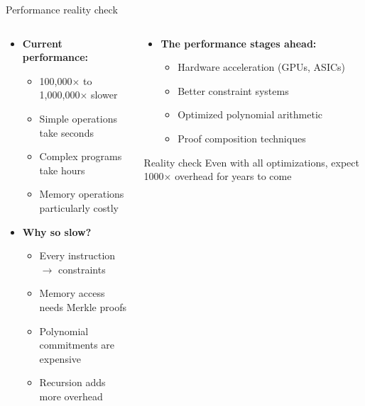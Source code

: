 \documentclass[aspectratio=169, lualatex, handout]{beamer}
\begin{document}
\begin{frame}{Performance reality check}
	\begin{columns}[c]
		\begin{column}{0.5\textwidth}
			\begin{itemize}
				\item \textbf{Current performance:}
				      \begin{itemize}
					      \item 100,000$\times$ to 1,000,000$\times$ slower
					      \item Simple operations take seconds
					      \item Complex programs take hours
					      \item Memory operations particularly costly
				      \end{itemize}
				\item \textbf{Why so slow?}
				      \begin{itemize}
					      \item Every instruction $\rightarrow$ constraints
					      \item Memory access needs Merkle proofs
					      \item Polynomial commitments are expensive
					      \item Recursion adds more overhead
				      \end{itemize}
			\end{itemize}
		\end{column}
		\begin{column}{0.5\textwidth}
			\begin{itemize}
				\item \textbf{The performance stages ahead:}
				      \begin{itemize}
					      \item Hardware acceleration (GPUs, ASICs)
					      \item Better constraint systems
					      \item Optimized polynomial arithmetic
					      \item Proof composition techniques
				      \end{itemize}
			\end{itemize}
			\begin{exampleblock}{Reality check}
				Even with all optimizations, expect 1000$\times$ overhead for years to come
			\end{exampleblock}
		\end{column}
	\end{columns}
\end{frame}
\end{document}
